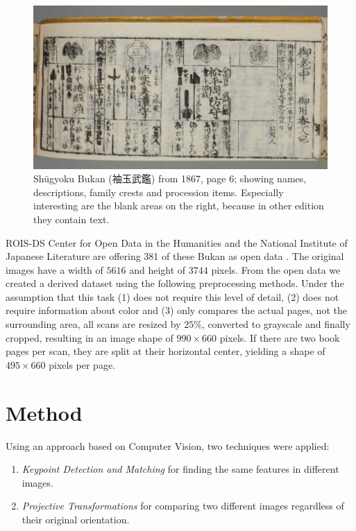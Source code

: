 \documentclass{ltjarticle}
\begin{document}
\begin{figure}
    \centering
    \includegraphics[width=\textwidth]{200019649_00006}
    \caption[Shūgyoku Bukan (袖玉武鑑), page 6]{Shūgyoku Bukan (袖玉武鑑) from 1867, page 6; showing names, descriptions, family crests and procession items. Especially interesting are the blank areas on the right, because in other edition they contain text.}
    \label{fig:shuugyokubukan006}
\end{figure}

ROIS-DS Center for Open Data in the Humanities and the National Institute of Japanese Literature are offering 381 of these Bukan as open data \cite{codh2018bukan}. The original images have a width of $5616$ and height of $3744$ pixels. From the open data we created a derived dataset using the following preprocessing methods. Under the assumption that this task (1) does not require this level of detail, (2) does not require information about color and (3) only compares the actual pages, not the surrounding area, all scans are resized by $25\%$, converted to grayscale and finally cropped, resulting in an image shape of $990 \times 660$ pixels. If there are two book pages per scan, they are split at their horizontal center, yielding a shape of $495 \times 660$ pixels per page.

\section{Method}

Using an approach based on Computer Vision, two techniques were applied:

\begin{enumerate}
    \item \emph{Keypoint Detection and Matching} for finding the same features in different images.
    \item \emph{Projective Transformations} for comparing two different images regardless of their original orientation.
\end{enumerate}
\end{document}
